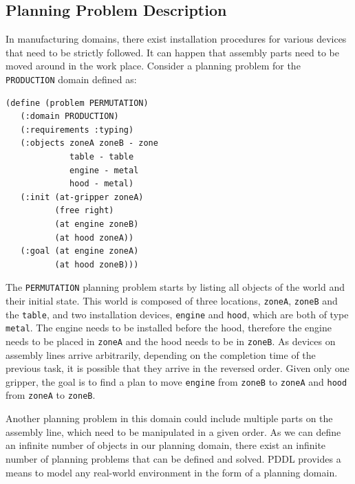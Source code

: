 \subsection{Planning Problem Description}\label{subsec:PPDescription}
In manufacturing domains, there exist installation procedures for various devices that need to be strictly followed. It can happen that assembly parts need to be moved around in the work place. Consider a planning problem for the \texttt{PRODUCTION} domain defined as:
\begin{verbatim}
(define (problem PERMUTATION)
   (:domain PRODUCTION)
   (:requirements :typing)
   (:objects zoneA zoneB - zone
             table - table
             engine - metal
             hood - metal)
   (:init (at-gripper zoneA)
          (free right)
          (at engine zoneB)
          (at hood zoneA))
   (:goal (at engine zoneA)
          (at hood zoneB)))
\end{verbatim}

The \texttt{PERMUTATION} planning problem starts by listing all objects of the world and their initial state. This world is composed of three locations, \texttt{zoneA}, \texttt{zoneB} and the \texttt{table}, and two installation devices, \texttt{engine} and \texttt{hood}, which are both of type \texttt{metal}. The engine needs to be installed before the hood, therefore the engine needs to be placed in \texttt{zoneA} and the hood needs to be in \texttt{zoneB}. As devices on assembly lines arrive arbitrarily, depending on the completion time of the previous task, it is possible that they arrive in the reversed order. Given only one gripper, the goal is to find a plan to move \texttt{engine} from \texttt{zoneB} to \texttt{zoneA} and \texttt{hood} from \texttt{zoneA} to \texttt{zoneB}. 

Another planning problem in this domain could include multiple parts on the assembly line, which need to be manipulated in a given order. 
As we can define an infinite number of objects in our planning domain, there exist an infinite number of planning problems that can be defined and solved. PDDL provides a means to model any real-world environment in the form of a planning domain. 

